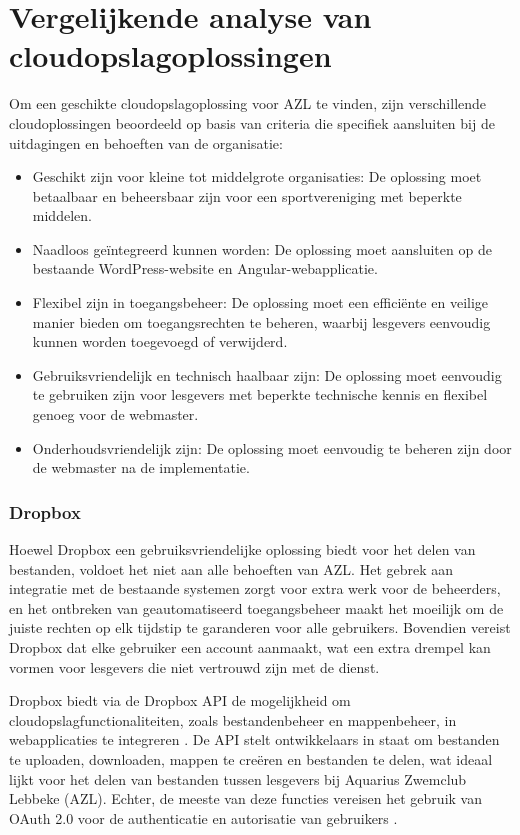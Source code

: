 \section{Vergelijkende analyse van cloudopslagoplossingen}
Om een geschikte cloudopslagoplossing voor AZL te vinden, zijn verschillende cloudoplossingen beoordeeld op basis van criteria die specifiek aansluiten bij de uitdagingen en behoeften van de organisatie:
\begin{itemize}
    \item Geschikt zijn voor kleine tot middelgrote organisaties: De oplossing moet betaalbaar en beheersbaar zijn voor een sportvereniging met beperkte middelen.
    \item Naadloos geïntegreerd kunnen worden: De oplossing moet aansluiten op de bestaande WordPress-website en Angular-webapplicatie.
    \item Flexibel zijn in toegangsbeheer: De oplossing moet een efficiënte en veilige manier bieden om toegangsrechten te beheren, waarbij lesgevers eenvoudig kunnen worden toegevoegd of verwijderd.
    \item Gebruiksvriendelijk en technisch haalbaar zijn: De oplossing moet eenvoudig te gebruiken zijn voor lesgevers met beperkte technische kennis en flexibel genoeg voor de webmaster.
    \item Onderhoudsvriendelijk zijn: De oplossing moet eenvoudig te beheren zijn door de webmaster na de implementatie.
\end{itemize}

\subsubsection{Dropbox}
Hoewel Dropbox een gebruiksvriendelijke oplossing biedt voor het delen van bestanden, voldoet het niet aan alle behoeften van AZL. 
Het gebrek aan integratie met de bestaande systemen zorgt voor extra werk voor de beheerders, en het ontbreken van geautomatiseerd 
toegangsbeheer maakt het moeilijk om de juiste rechten op elk tijdstip te garanderen voor alle gebruikers. Bovendien vereist Dropbox dat 
elke gebruiker een account aanmaakt, wat een extra drempel kan vormen voor lesgevers die niet vertrouwd zijn met de dienst.

Dropbox biedt via de Dropbox API de mogelijkheid om cloudopslagfunctionaliteiten, zoals bestandenbeheer en mappenbeheer, in webapplicaties te integreren \autocite{dropbox_api}. 
De API stelt ontwikkelaars in staat om bestanden te uploaden, downloaden, mappen te creëren en bestanden te delen, wat ideaal lijkt voor het delen van 
bestanden tussen lesgevers bij Aquarius Zwemclub Lebbeke (AZL). Echter, de meeste van deze functies vereisen het gebruik van OAuth 2.0 voor de authenticatie 
en autorisatie van gebruikers \autocite{dropbox_oauth}.

